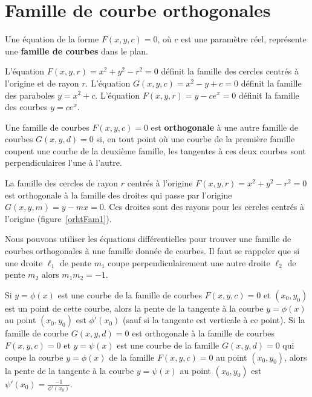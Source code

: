 {\section{Famille de courbe orthogonales \eng}

\begin{defn} 
Une équation de la forme $F(x,y,c)=0$, où $c$ est une paramètre réel,
représente une {\bfseries famille de courbes} dans le plan.
\end{defn}

\begin{egg}
L'équation $F(x,y,r) = x^2+y^2-r^2 = 0$ définit la famille des cercles
centrés à l'origine et de rayon $r$.  L'équation
$G(x,y,c) = x^2 -y + c = 0$ définit la famille des paraboles
$y=x^2 +c$.  L'équation 
$F(x,y,r) = y - c e^x = 0$ définit la famille des courbes $y=ce^x$.
\end{egg}

\begin{defn} 
Une famille de courbes $F(x,y,c)=0$ est {\bfseries orthogonale} à une
autre famille de courbes $G(x,y,d)=0$ si, en tout point où une courbe
de la première famille coupent une courbe de la deuxième famille, les
tangentes à ces deux courbes sont perpendiculaires l'une à l'autre.
\end{defn}

\begin{egg}
La famille des cercles de rayon $r$ centrés à l'origine
$F(x,y,r) = x^2+y^2-r^2=0$ est orthogonale à la famille des droites
qui passe par l'origine $G(x,y,m) = y - mx =0$.  Ces droites sont des
rayons pour les cercles centrés à l'origine (figure~\ref{orhtFam1}).
\end{egg}


Nous pouvons utiliser les équations différentielles pour trouver une
famille de courbes orthogonales à une famille donnée de courbes.  Il
faut se rappeler que si une droite $\ell_1$ de pente $m_1$ coupe
perpendiculairement une autre droite $\ell_2$ de pente $m_2$ alors
$m_1 m_2 = -1$.

Si $y=\phi(x)$ est une courbe de la famille de courbes $F(x,y,c)=0$ et
$(x_0,y_0)$ est un point de cette courbe, alors la pente de la
tangente à la courbe $y=\phi(x)$ au point $(x_0,y_0)$ est $\phi'(x_0)$
(sauf si la tangente est verticale à ce point).  Si la famille de courbe
$G(x,y,d)=0$ est orthogonale à la famille de courbes $F(x,y,c)=0$ et
$y=\psi(x)$ est une courbe de la famille $G(x,y,d)=0$ qui coupe la courbe
$y=\phi(x)$ de la famille $F(x,y,c)=0$ au point $(x_0,y_0)$, alors la
pente de la tangente à la courbe $y=\psi(x)$ au point $(x_0,y_0)$ est
$\displaystyle \psi'(x_0) = \frac{-1}{\phi'(x_0)}$.

}
